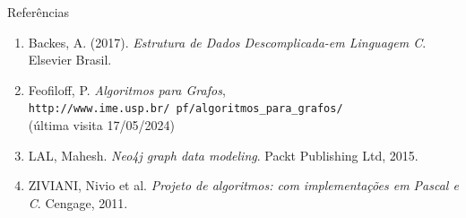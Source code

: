 \documentclass{if-beamer}
\begin{document}
\begin{frame}{Referências}
	
	\begin{enumerate}
		\item Backes, A. (2017). \textit{Estrutura de Dados Descomplicada-em Linguagem C}. Elsevier Brasil.
		
		\item Feofiloff, P. \textit{Algoritmos para Grafos}, \\ \texttt{http://www.ime.usp.br/~pf/algoritmos\_para\_grafos/} \\ (última visita 17/05/2024)
		
		\item LAL, Mahesh. \textit{Neo4j graph data modeling}. Packt Publishing Ltd, 2015.
		
		\item ZIVIANI, Nivio et al. \textit{Projeto de algoritmos: com implementações em Pascal e C}. Cengage, 2011.
	\end{enumerate}

\end{frame}

\end{document}
